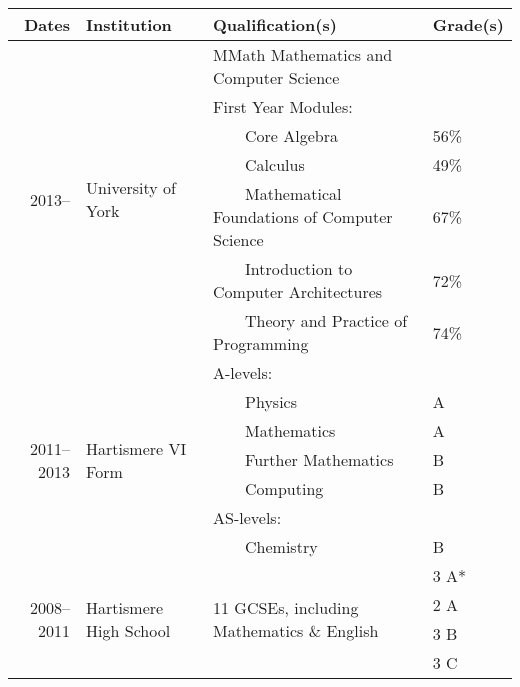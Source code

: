 \documentclass[11pt,a4paper]{article}
\begin{document}
\begin{tabular}{r | l | l | l}
  Dates                       & Institution
  & Qualification(s)                                            & Grade(s) \\ \hline
  \multirow{7}{*}{2013--}     & \multirow{7}{*}{University of York}
  & MMath Mathematics and Computer Science                      &      \\
                              &
  & First Year Modules:                                         &      \\
                              &
  & ~~~~Core Algebra                                            & 56\% \\
                              & 
  & ~~~~Calculus                                                & 49\% \\
                              & 
  & ~~~~Mathematical Foundations of Computer Science            & 67\% \\
                              & 
  & ~~~~Introduction to Computer Architectures                  & 72\% \\
                              &
  & ~~~~Theory and Practice of Programming                      & 74\% \\ \hline
  \multirow{7}{*}{2011--2013} & \multirow{7}{*}{Hartismere VI Form}
  & A-levels:                                                   &   \\
                              &
  & ~~~~Physics                                                 & A \\
                              & 
  & ~~~~Mathematics                                             & A \\
                              &
  & ~~~~Further Mathematics                                     & B \\
                              &
  & ~~~~Computing                                               & B \\
                              &
  & AS-levels:                                                  &   \\
                              &
  & ~~~~Chemistry                                               & B \\   \hline
  \multirow{4}{*}{2008--2011} & \multirow{4}{*}{Hartismere High School}
  & \multirow{4}{*}{11 GCSEs, including Mathematics \& English} & 3 A* \\
                              &
  &                                                             & 2 A  \\
                              & 
  &                                                             & 3 B  \\
                              &
  &                                                             & 3 C  \\
\end{tabular}
\end{document}
